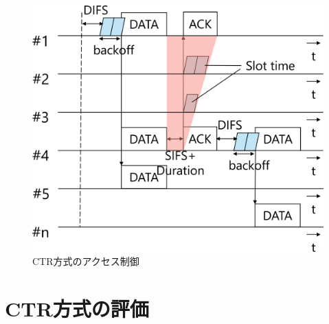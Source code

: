 \documentclass[a4paper,10pt]{ltjsarticle}
\begin{document}
\begin{figure}[H]
  \centering
  \includegraphics[width=\linewidth]{CTR_accsess.pdf} %
  \caption{CTR方式のアクセス制御}
  \label{fig:CTR方式のアクセス制御} %
\end{figure}
\section{CTR方式の評価}
\end{document}
